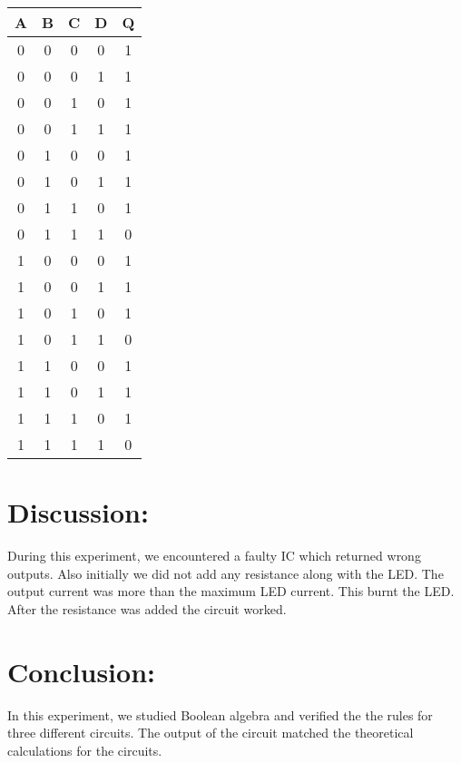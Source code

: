 \documentclass[12pt]{article}
\begin{document}
\begin{table}[H]
	\centering
	\begin{tabular}{|c|c|c|c||c|}
		\hline
		\textbf{A} & \textbf{B} & \textbf{C} & \textbf{D} & \textbf{Q} \\
		\hline \hline
		0 & 0 & 0 & 0 & 1 \\
		\hline
		0 & 0 & 0 & 1 & 1 \\
		\hline
		0 & 0 & 1 & 0 & 1 \\
		\hline
		0 & 0 & 1 & 1 & 1 \\
		\hline
		0 & 1 & 0 & 0 & 1 \\
		\hline
		0 & 1 & 0 & 1 & 1 \\
		\hline
		0 & 1 & 1 & 0 & 1 \\
		\hline
		0 & 1 & 1 & 1 & 0 \\
		\hline
		1 & 0 & 0 & 0 & 1 \\
		\hline
		1 & 0 & 0 & 1 & 1 \\
		\hline
		1 & 0 & 1 & 0 & 1 \\
		\hline
		1 & 0 & 1 & 1 & 0 \\
		\hline
		1 & 1 & 0 & 0 & 1 \\
		\hline
		1 & 1 & 0 & 1 & 1 \\
		\hline
		1 & 1 & 1 & 0 & 1 \\
		\hline
		1 & 1 & 1 & 1 & 0 \\
		\hline
	\end{tabular}
\end{table}
\section{Discussion:}
During this experiment, we encountered a faulty IC which returned wrong outputs. Also initially we did not add any resistance along with the LED. The output current was more than the maximum LED current. This burnt the LED. After the resistance was added the circuit worked.
\section{Conclusion:}
In this experiment, we studied Boolean algebra and verified the the rules for three different circuits. The output of the circuit matched the theoretical calculations for the circuits.
\end{document}
